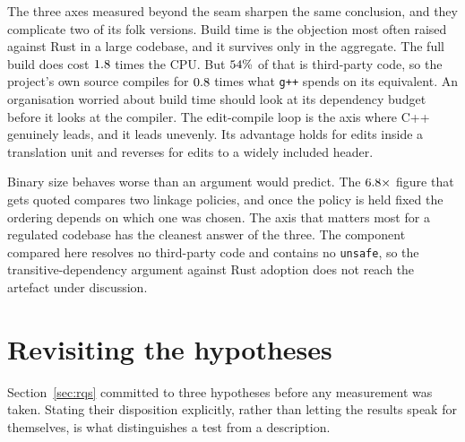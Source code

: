 \documentclass[english,oneside,a4paper,censored,csm,software-track-2020]{HYthesisML}
\begin{document}
The three axes measured beyond the seam sharpen the same conclusion, and they complicate two of its
folk versions. Build time is the objection most often raised against Rust in a large codebase, and
it survives only in the aggregate. The full build does cost $1.8$ times the CPU. But
$54\%$ of that is third-party code, so the project's own source compiles for
$0.8$ times what \texttt{g++} spends on its equivalent. An organisation
worried about build time should look at its dependency budget before it looks at the
compiler. The edit-compile loop is the axis where C++ genuinely leads, and it leads unevenly. Its
advantage holds for edits inside a translation unit and reverses for edits to a widely included
header.

Binary size behaves worse than an argument would predict. The $6.8\times$
figure that gets quoted compares two linkage policies, and once the policy is held fixed
the ordering depends on which one was chosen. The axis that matters most for a regulated codebase
has the cleanest answer of the three. The component compared here resolves no third-party code
and contains no \texttt{unsafe}, so the transitive-dependency argument against Rust adoption does
not reach the artefact under discussion.

\section{Revisiting the hypotheses}\label{sec:hypotheses}
Section~\ref{sec:rqs} committed to three hypotheses before any measurement was
taken. Stating their disposition explicitly, rather than letting the results speak for
themselves, is what distinguishes a test from a description.
\end{document}
